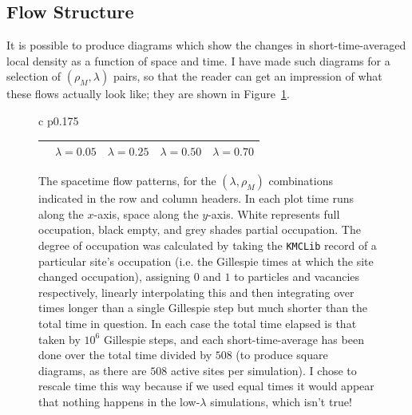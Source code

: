 \subsection{Flow Structure}
\label{sec:flowStruc}
It is possible to produce diagrams which show the changes in short-time-averaged local density as a function of space and time. I have made such diagrams for a selection of $(\rho_M, \lambda)$ pairs, so that the reader can
get an impression of what these flows actually look like; they are shown in Figure~\ref{fig:flowPatterns}.
\iffalse
\begin{figure}[h!]
\caption{\label{fig:flowPatterns} The spacetime flow patterns, for the $(\lambda, \rho_M)$ combinations indicated in the row and column headers. In each plot time runs along the $x$-axis, space along the $y$-axis. White represents full occupation, black empty, and grey shades partial
occupation. The degree of occupation was calculated by taking the \texttt{KMCLib} record of a particular site's occupation (i.e. the Gillespie times at
which the site changed occupation), assigning $0$ and $1$ to particles and vacancies respectively, linearly interpolating this and then integrating over times longer than a single Gillespie step but much shorter than the total time in question.
In each case the total time elapsed is that taken by $10^6$ Gillespie steps, and each short-time-average has been done over the total time divided by $508$ (to produce square diagrams, as there are $508$ active sites
per simulation). I chose to rescale time this way because if we used equal times it would appear that nothing happens in the low-$\lambda$ simulations, which isn't true!}
\begin{tabular}{c p{0.175\linewidth}}
\hspace{-2em}\begin{tabular}{c|c@{\hspace{0.25em}}c@{\hspace{0.25em}}c@{\hspace{0.25em}}c  }
  &  $\lambda=0.05$ & $\lambda=0.25$ & $\lambda=0.50$ & $\lambda=0.70$ \\ 
  \hline

\end{tabular}
\end{tabular}
\end{figure}
